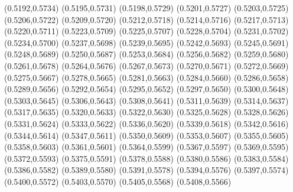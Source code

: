 \PST@Filltriangle(0.5192,0.5734)
\PST@Filltriangle(0.5195,0.5731)
\PST@Filltriangle(0.5198,0.5729)
\PST@Filltriangle(0.5201,0.5727)
\PST@Filltriangle(0.5203,0.5725)
\PST@Filltriangle(0.5206,0.5722)
\PST@Filltriangle(0.5209,0.5720)
\PST@Filltriangle(0.5212,0.5718)
\PST@Filltriangle(0.5214,0.5716)
\PST@Filltriangle(0.5217,0.5713)
\PST@Filltriangle(0.5220,0.5711)
\PST@Filltriangle(0.5223,0.5709)
\PST@Filltriangle(0.5225,0.5707)
\PST@Filltriangle(0.5228,0.5704)
\PST@Filltriangle(0.5231,0.5702)
\PST@Filltriangle(0.5234,0.5700)
\PST@Filltriangle(0.5237,0.5698)
\PST@Filltriangle(0.5239,0.5695)
\PST@Filltriangle(0.5242,0.5693)
\PST@Filltriangle(0.5245,0.5691)
\PST@Filltriangle(0.5248,0.5689)
\PST@Filltriangle(0.5250,0.5687)
\PST@Filltriangle(0.5253,0.5684)
\PST@Filltriangle(0.5256,0.5682)
\PST@Filltriangle(0.5259,0.5680)
\PST@Filltriangle(0.5261,0.5678)
\PST@Filltriangle(0.5264,0.5676)
\PST@Filltriangle(0.5267,0.5673)
\PST@Filltriangle(0.5270,0.5671)
\PST@Filltriangle(0.5272,0.5669)
\PST@Filltriangle(0.5275,0.5667)
\PST@Filltriangle(0.5278,0.5665)
\PST@Filltriangle(0.5281,0.5663)
\PST@Filltriangle(0.5284,0.5660)
\PST@Filltriangle(0.5286,0.5658)
\PST@Filltriangle(0.5289,0.5656)
\PST@Filltriangle(0.5292,0.5654)
\PST@Filltriangle(0.5295,0.5652)
\PST@Filltriangle(0.5297,0.5650)
\PST@Filltriangle(0.5300,0.5648)
\PST@Filltriangle(0.5303,0.5645)
\PST@Filltriangle(0.5306,0.5643)
\PST@Filltriangle(0.5308,0.5641)
\PST@Filltriangle(0.5311,0.5639)
\PST@Filltriangle(0.5314,0.5637)
\PST@Filltriangle(0.5317,0.5635)
\PST@Filltriangle(0.5320,0.5633)
\PST@Filltriangle(0.5322,0.5630)
\PST@Filltriangle(0.5325,0.5628)
\PST@Filltriangle(0.5328,0.5626)
\PST@Filltriangle(0.5331,0.5624)
\PST@Filltriangle(0.5333,0.5622)
\PST@Filltriangle(0.5336,0.5620)
\PST@Filltriangle(0.5339,0.5618)
\PST@Filltriangle(0.5342,0.5616)
\PST@Filltriangle(0.5344,0.5614)
\PST@Filltriangle(0.5347,0.5611)
\PST@Filltriangle(0.5350,0.5609)
\PST@Filltriangle(0.5353,0.5607)
\PST@Filltriangle(0.5355,0.5605)
\PST@Filltriangle(0.5358,0.5603)
\PST@Filltriangle(0.5361,0.5601)
\PST@Filltriangle(0.5364,0.5599)
\PST@Filltriangle(0.5367,0.5597)
\PST@Filltriangle(0.5369,0.5595)
\PST@Filltriangle(0.5372,0.5593)
\PST@Filltriangle(0.5375,0.5591)
\PST@Filltriangle(0.5378,0.5588)
\PST@Filltriangle(0.5380,0.5586)
\PST@Filltriangle(0.5383,0.5584)
\PST@Filltriangle(0.5386,0.5582)
\PST@Filltriangle(0.5389,0.5580)
\PST@Filltriangle(0.5391,0.5578)
\PST@Filltriangle(0.5394,0.5576)
\PST@Filltriangle(0.5397,0.5574)
\PST@Filltriangle(0.5400,0.5572)
\PST@Filltriangle(0.5403,0.5570)
\PST@Filltriangle(0.5405,0.5568)
\PST@Filltriangle(0.5408,0.5566)
